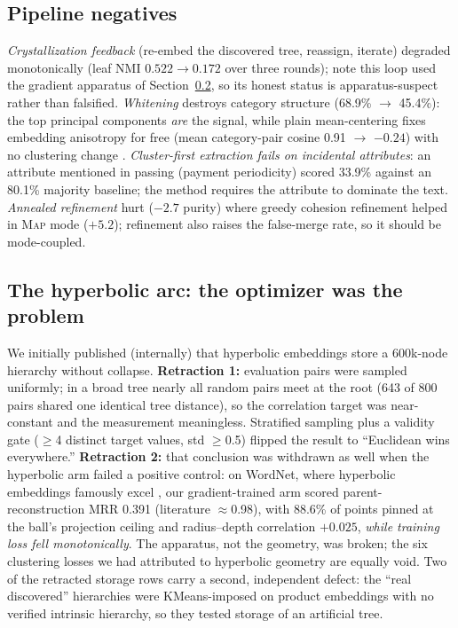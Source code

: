 \documentclass[11pt]{article}
\begin{document}
\subsection{Pipeline negatives}
\emph{Crystallization feedback} (re-embed the discovered tree, reassign, iterate) degraded monotonically (leaf NMI $0.522 \rightarrow 0.172$ over three rounds); note this loop used the gradient apparatus of Section~\ref{sec:hyperbolic}, so its honest status is apparatus-suspect rather than falsified. \emph{Whitening} destroys category structure (68.9\% $\rightarrow$ 45.4\%): the top principal components \emph{are} the signal, while plain mean-centering fixes embedding anisotropy for free (mean category-pair cosine 0.91 $\rightarrow$ $-0.24$) with no clustering change \cite{mu2018}. \emph{Cluster-first extraction fails on incidental attributes}: an attribute mentioned in passing (payment periodicity) scored 33.9\% against an 80.1\% majority baseline; the method requires the attribute to dominate the text. \emph{Annealed refinement} hurt ($-2.7$ purity) where greedy cohesion refinement helped in \textsc{Map} mode ($+5.2$); refinement also raises the false-merge rate, so it should be mode-coupled.

\subsection{The hyperbolic arc: the optimizer was the problem}\label{sec:hyperbolic}
We initially published (internally) that hyperbolic embeddings store a 600k-node hierarchy without collapse. \textbf{Retraction 1:} evaluation pairs were sampled uniformly; in a broad tree nearly all random pairs meet at the root (643 of 800 pairs shared one identical tree distance), so the correlation target was near-constant and the measurement meaningless. Stratified sampling plus a validity gate ($\geq$4 distinct target values, std $\geq$0.5) flipped the result to ``Euclidean wins everywhere.'' \textbf{Retraction 2:} that conclusion was withdrawn as well when the hyperbolic arm failed a positive control: on WordNet, where hyperbolic embeddings famously excel \cite{nickel2017,sala2018}, our gradient-trained arm scored parent-reconstruction MRR 0.391 (literature $\approx$0.98), with 88.6\% of points pinned at the ball's projection ceiling and radius--depth correlation $+0.025$, \emph{while training loss fell monotonically}. The apparatus, not the geometry, was broken; the six clustering losses we had attributed to hyperbolic geometry are equally void. Two of the retracted storage rows carry a second, independent defect: the ``real discovered'' hierarchies were KMeans-imposed on product embeddings with no verified intrinsic hierarchy, so they tested storage of an artificial tree.
\end{document}
